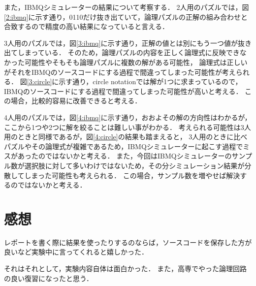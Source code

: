 \documentclass[titlepage,a4paper]{jsarticle}
\begin{document}
また，IBMQシミュレーターの結果について考察する．
2人用のパズルでは，図\ref{2:ibmq}に示す通り，0110だけ抜き出ていて，論理パズルの正解の組み合わせと合致するので精度の高い結果になっていると言える．

3人用のパズルでは，図\ref{3:ibmq}に示す通り，正解の値とは別にもう一つ値が抜き出てしまっている．
そのため，論理パズルの内容を正しく論理式に反映できなかった可能性やそもそも論理パズルに複数の解がある可能性，
論理式は正しいがそれをIBMQのソースコードにする過程で間違ってしまった可能性が考えられる．
図\ref{3:circle}に示す通り，circle notationでは解が1つに求まっているので，IBMQのソースコードにする過程で間違ってしまった可能性が高いと考える．
この場合，比較的容易に改善できると考える．

4人用のパズルでは，図\ref{4:ibmq}に示す通り，おおよその解の方向性はわかるが，ここから1つや2つに解を絞ることは難しい事がわかる．
考えられる可能性は3人用のときと同様であるが，図\ref{4:circle}の結果も踏まえると，
3人用のときに比べパズルやその論理式が複雑であるため，IBMQシミュレーターに起こす過程でミスがあったのではないかと考える．
また，今回はIBMQシミュレーターのサンプル数が選択肢に対して多いわけではないため，その分シミュレーション結果が分散してしまった可能性も考えられる．
この場合，サンプル数を増やせば解決するのではないかと考える．

\section{感想}
レポートを書く際に結果を使ったりするのならば，ソースコードを保存した方が良いなど実験中に言ってくれると嬉しかった．

それはそれとして，実験内容自体は面白かった．
また，高専でやった論理回路の良い復習になったと思う．
\end{document}
